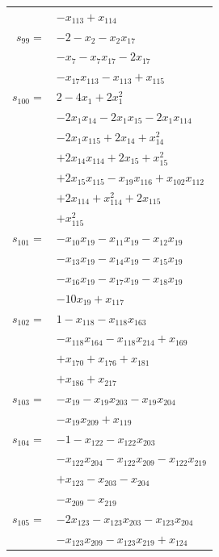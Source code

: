 \begin{longtable}{@{}r@{\;}l@{}}
 & \(\displaystyle -x_{113} +x_{114}\) \\[3pt]
\(s_{99}=\) & \(\displaystyle -2 -x_{2} -x_{2}x_{17}\) \\
 & \(\displaystyle -x_{7} -x_{7}x_{17} -2x_{17}\) \\
 & \(\displaystyle -x_{17}x_{113} -x_{113} +x_{115}\) \\[3pt]
\(s_{100}=\) & \(\displaystyle 2 -4x_{1} +2x_{1}^{2}\) \\
 & \(\displaystyle -2x_{1}x_{14} -2x_{1}x_{15} -2x_{1}x_{114}\) \\
 & \(\displaystyle -2x_{1}x_{115} +2x_{14} +x_{14}^{2}\) \\
 & \(\displaystyle +2x_{14}x_{114} +2x_{15} +x_{15}^{2}\) \\
 & \(\displaystyle +2x_{15}x_{115} -x_{19}x_{116} +x_{102}x_{112}\) \\
 & \(\displaystyle +2x_{114} +x_{114}^{2} +2x_{115}\) \\
 & \(\displaystyle +x_{115}^{2}\) \\[3pt]
\(s_{101}=\) & \(\displaystyle -x_{10}x_{19} -x_{11}x_{19} -x_{12}x_{19}\) \\
 & \(\displaystyle -x_{13}x_{19} -x_{14}x_{19} -x_{15}x_{19}\) \\
 & \(\displaystyle -x_{16}x_{19} -x_{17}x_{19} -x_{18}x_{19}\) \\
 & \(\displaystyle -10x_{19} +x_{117}\) \\[3pt]
\(s_{102}=\) & \(\displaystyle 1 -x_{118} -x_{118}x_{163}\) \\
 & \(\displaystyle -x_{118}x_{164} -x_{118}x_{214} +x_{169}\) \\
 & \(\displaystyle +x_{170} +x_{176} +x_{181}\) \\
 & \(\displaystyle +x_{186} +x_{217}\) \\[3pt]
\(s_{103}=\) & \(\displaystyle -x_{19} -x_{19}x_{203} -x_{19}x_{204}\) \\
 & \(\displaystyle -x_{19}x_{209} +x_{119}\) \\[3pt]
\(s_{104}=\) & \(\displaystyle -1 -x_{122} -x_{122}x_{203}\) \\
 & \(\displaystyle -x_{122}x_{204} -x_{122}x_{209} -x_{122}x_{219}\) \\
 & \(\displaystyle +x_{123} -x_{203} -x_{204}\) \\
 & \(\displaystyle -x_{209} -x_{219}\) \\[3pt]
\(s_{105}=\) & \(\displaystyle -2x_{123} -x_{123}x_{203} -x_{123}x_{204}\) \\
 & \(\displaystyle -x_{123}x_{209} -x_{123}x_{219} +x_{124}\) \\[3pt]

\end{longtable}
